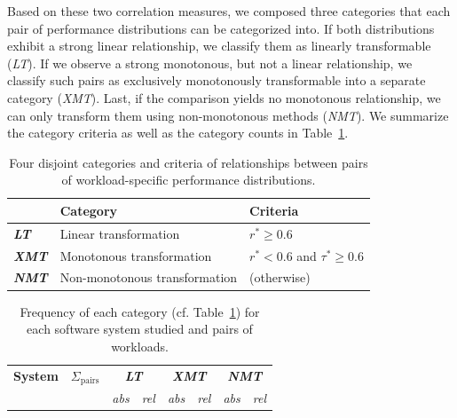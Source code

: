 {\color{black}Based on these two correlation measures, we composed three categories that each pair of performance distributions can be categorized into.
If both distributions exhibit a strong linear relationship, we classify them as linearly transformable (\textit{\colorbox{lt-color}{LT}}). If we observe a strong monotonous, but not a linear relationship, we classify such pairs as exclusively monotonously transformable into a separate category (\textit{\colorbox{xmt-color}{XMT}}). Last, if the comparison yields no monotonous relationship, we can only transform them using non-monotonous methods (\textit{\colorbox{nmt-color}{NMT}}). 
We summarize the category criteria as well as the category counts in Table~\ref{tab:categorization}. 

\begin{table}
	\footnotesize
	\caption{Four disjoint categories and criteria of relationships between pairs of workload-specific performance distributions.}
	\centering
\begin{tabular}{lp{4.1cm}p{2.8cm}}	
	\toprule
	 \textbf{} & \textbf{Category} & \textbf{Criteria}\\
	 \midrule
	 \rowcolor{lt-color!40!white}\cellcolor{lt-color}\textit{\textbf{LT}} & {Linear transformation} & $r^* \geq 0.6$ \\
	\rowcolor{xmt-color!40!white}\cellcolor{xmt-color}\textit{\textbf{XMT}} & {Monotonous transformation} & $r^* < 0.6 $ and $ \tau^* \geq 0.6$ \\
	\rowcolor{nmt-color!40!white}\cellcolor{nmt-color}\textit{\textbf{NMT}} & {Non-monotonous transformation}  & (otherwise) \\%
	\bottomrule
\end{tabular}
\label{tab:categorization}
\end{table}

\begin{table}
	\footnotesize
	\centering
	\caption{Frequency of each category (cf. Table~\ref{tab:categorization}) for each software system studied and pairs of workloads.}
\begin{tabular}{p{1.1cm}rrrrrrr}	
	\toprule
	\textbf{System} & \textbf{$\Sigma_\text{pairs}$} & \multicolumn{2}{c}{\textbf{\cellcolor{lt-color}\textit{LT}}} & \multicolumn{2}{c}{\textbf{\cellcolor{xmt-color}\textit{XMT}}} & \multicolumn{2}{c}{\textbf{\cellcolor{nmt-color}\textit{NMT}}}\\
	  & & \textit{abs} &\textit{rel} & \textit{abs} & \textit{rel}& \textit{abs} & \textit{rel}\\
	\midrule
	

\end{tabular}
\end{table}}
